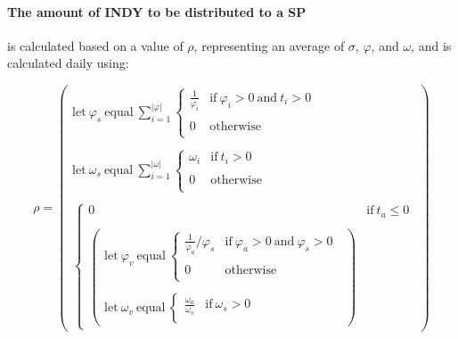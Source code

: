 \documentclass{article}
\begin{document}
\begin{sloppypar}
\filbreak

\hypertarget{the-amount-of-indy-to-be-distributed-to-a-sp}{%
\paragraph{The amount of INDY to be distributed to a
SP}\label{the-amount-of-indy-to-be-distributed-to-a-sp}}

is calculated based on a value of \(\rho\), representing an average of
\(\sigma\), \(\varphi\), and \(\omega\), and is calculated daily using:

\[\rho = \begin{pmatrix}
\text{let}\ \varphi_{s}\ \text{equal}\ \sum_{i = 1}^{\left| \varphi \right|}\left\{ \begin{matrix}
\frac{1}{\varphi_{i}} & \text{if}\ \varphi_{i} > 0\ \text{and}\ t_{i} > 0 \\
\  & \  \\
0 & \text{otherwise} \\
\end{matrix} \right.\  \\
\  \\
\text{let}\ \omega_{s}\ \text{equal}\ \sum_{i = 1}^{\left| \omega \right|}\left\{ \begin{matrix}
\omega_{i} & \text{if}\ t_{i} > 0 \\
\  & \  \\
0 & \text{otherwise} \\
\end{matrix} \right.\  \\
\  \\
\left\{ \begin{matrix}
0 & \text{if}\ t_{a} \leq 0 \\
\  & \  \\
\begin{pmatrix}
\text{let}\ \varphi_{v}\ \text{equal}\ \left\{ \begin{matrix}
\frac{1}{\varphi_{a}}/\varphi_{s} & \text{if}\ \varphi_{a} > 0\ \text{and}\ \varphi_{s} > 0 \\
\  & \  \\
0 & \text{otherwise} \\
\end{matrix} \right.\  \\
\  \\
\text{let}\ \omega_{v}\ \text{equal}\ \left\{ \begin{matrix}
\frac{\omega_{a}}{\omega_{s}} & \text{if}\ \omega_{s} > 0 \\

\end{matrix}
\end{pmatrix}
\end{matrix}
\end{pmatrix}\]
\end{sloppypar}
\end{document}
